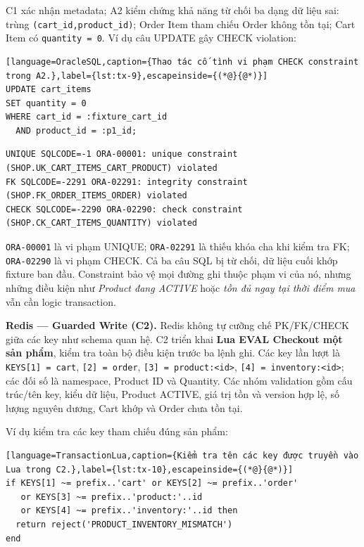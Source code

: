 C1 xác nhận metadata; A2 kiểm chứng khả năng từ chối ba dạng dữ liệu sai: trùng \texttt{(cart\_\allowbreak{}id,product\_\allowbreak{}id)}; Order Item tham chiếu Order không tồn tại; Cart Item có \texttt{quantity =\allowbreak{} 0}. Ví dụ câu UPDATE gây CHECK violation:

\begin{lstlisting}[language=OracleSQL,caption={Thao tác cố tình vi phạm CHECK constraint trong A2.},label={lst:tx-9},escapeinside={(*@}{@*)}]
UPDATE cart_items
SET quantity = 0
WHERE cart_id = :fixture_cart_id
  AND product_id = :p1_id;
\end{lstlisting}

\begingroup
{}\label{result:tx-6}
\nopagebreak[4]
\begin{Verbatim}
UNIQUE SQLCODE=-1 ORA-00001: unique constraint
(SHOP.UK_CART_ITEMS_CART_PRODUCT) violated
FK SQLCODE=-2291 ORA-02291: integrity constraint
(SHOP.FK_ORDER_ITEMS_ORDER) violated
CHECK SQLCODE=-2290 ORA-02290: check constraint
(SHOP.CK_CART_ITEMS_QUANTITY) violated
\end{Verbatim}
\endgroup\par\smallskip
\texttt{ORA-\allowbreak{}00001} là vi phạm UNIQUE; \texttt{ORA-\allowbreak{}02291} là thiếu khóa cha khi kiểm tra FK; \texttt{ORA-\allowbreak{}02290} là vi phạm CHECK. Cả ba câu SQL bị từ chối, dữ liệu cuối khớp fixture ban đầu. Constraint bảo vệ mọi đường ghi thuộc phạm vi của nó, nhưng những điều kiện như \emph{Product đang ACTIVE} hoặc \emph{tồn đủ ngay tại thời điểm mua} vẫn cần logic transaction.

\textbf{Redis — Guarded Write (C2).} Redis không tự cưỡng chế PK/FK/CHECK giữa các key như schema quan hệ. C2 triển khai \textbf{Lua EVAL Checkout một sản phẩm}, kiểm tra toàn bộ điều kiện trước ba lệnh ghi. Các key lần lượt là \texttt{KEYS[1] =\allowbreak{} cart}, \texttt{[2] =\allowbreak{} order}, \texttt{[3] =\allowbreak{} product:\allowbreak{}<id>}, \texttt{[4] =\allowbreak{} inventory:\allowbreak{}<id>}; các đối số là namespace, Product ID và Quantity. Các nhóm validation gồm cấu trúc/tên key, kiểu dữ liệu, Product ACTIVE, giá trị tồn và version hợp lệ, số lượng nguyên dương, Cart khớp và Order chưa tồn tại.

Ví dụ kiểm tra các key tham chiếu đúng sản phẩm:

\begin{lstlisting}[language=TransactionLua,caption={Kiểm tra tên các key được truyền vào Lua trong C2.},label={lst:tx-10},escapeinside={(*@}{@*)}]
if KEYS[1] ~= prefix..'cart' or KEYS[2] ~= prefix..'order'
   or KEYS[3] ~= prefix..'product:'..id
   or KEYS[4] ~= prefix..'inventory:'..id then
  return reject('PRODUCT_INVENTORY_MISMATCH')
end
\end{lstlisting}

